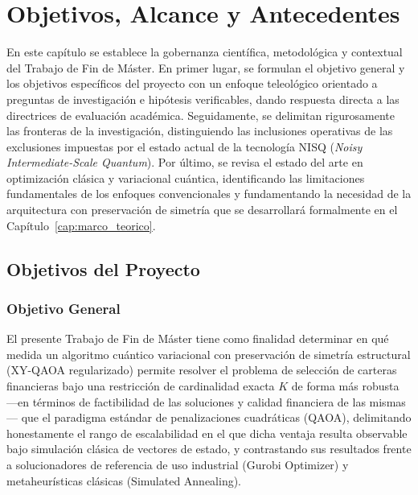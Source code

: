 \chapter{Objetivos, Alcance y Antecedentes}
\label{cap:objetivos_alcance_antecedentes}

En este capítulo se establece la gobernanza científica, metodológica y contextual del Trabajo de Fin de Máster. En primer lugar, se formulan el objetivo general y los objetivos específicos del proyecto con un enfoque teleológico orientado a preguntas de investigación e hipótesis verificables, dando respuesta directa a las directrices de evaluación académica. Seguidamente, se delimitan rigurosamente las fronteras de la investigación, distinguiendo las inclusiones operativas de las exclusiones impuestas por el estado actual de la tecnología NISQ (\textit{Noisy Intermediate-Scale Quantum}). Por último, se revisa el estado del arte en optimización clásica y variacional cuántica, identificando las limitaciones fundamentales de los enfoques convencionales y fundamentando la necesidad de la arquitectura con preservación de simetría que se desarrollará formalmente en el Capítulo~\ref{cap:marco_teorico}.

\section{Objetivos del Proyecto}
\label{sec:objetivos_proyecto}

\subsection{Objetivo General}
\label{subsec:objetivo_general}

El presente Trabajo de Fin de Máster tiene como finalidad determinar en qué medida un algoritmo cuántico variacional con preservación de simetría estructural (XY-QAOA regularizado) permite resolver el problema de selección de carteras financieras bajo una restricción de cardinalidad exacta $K$ de forma más robusta ---en términos de factibilidad de las soluciones y calidad financiera de las mismas--- que el paradigma estándar de penalizaciones cuadráticas (QAOA), delimitando honestamente el rango de escalabilidad en el que dicha ventaja resulta observable bajo simulación clásica de vectores de estado, y contrastando sus resultados frente a solucionadores de referencia de uso industrial (Gurobi Optimizer) y metaheurísticas clásicas (Simulated Annealing).


